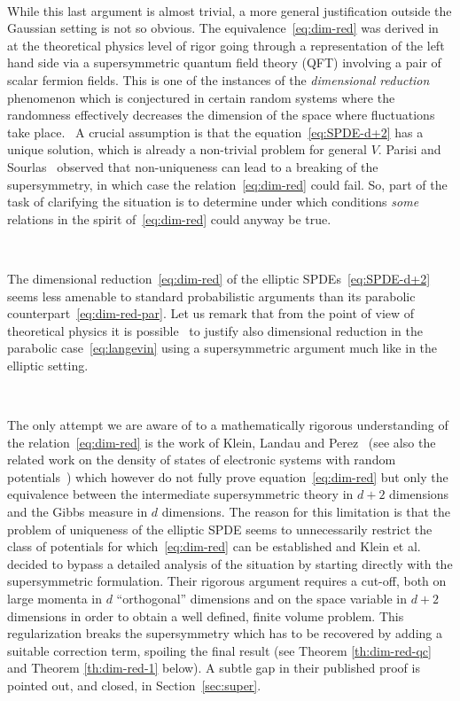 \documentclass[a4paper,10pt]{article}
\newcommand{\tmtextit}[1]{{\itshape{#1}}}
\begin{document}
\

While this last argument is almost trivial, a more general justification
outside the Gaussian setting is not so obvious. The
equivalence~{\eqref{eq:dim-red}} was derived
in~{\cite{parisi_random_1979,parisi_supersymmetric_1982}} at the theoretical
physics level of rigor going through a representation of the left hand side
via a supersymmetric quantum field theory (QFT) involving a pair of scalar
fermion fields. This is one of the instances of the \tmtextit{dimensional
reduction} phenomenon which is conjectured in certain random systems where the
randomness effectively decreases the dimension of the space where fluctuations
take place. \ A crucial assumption is that the equation~{\eqref{eq:SPDE-d+2}}
has a unique solution, which is already a non-trivial problem for general $V$.
Parisi and Sourlas~{\cite{parisi_supersymmetric_1982}} observed that
non-uniqueness can lead to a breaking of the supersymmetry, in which case the
relation~{\eqref{eq:dim-red}} could fail. So, part of the task of clarifying
the situation is to determine under which conditions \tmtextit{some} relations
in the spirit of~{\eqref{eq:dim-red}} could anyway be true.

\

The dimensional reduction~{\eqref{eq:dim-red}} of the elliptic
SPDEs~{\eqref{eq:SPDE-d+2}} seems less amenable to standard probabilistic
arguments than its parabolic counterpart~{\eqref{eq:dim-red-par}}. Let us
remark that from the point of view of theoretical physics it is
possible~{\cite{damgaard_stochastic_1988,parisi_supersymmetric_1982}} to
justify also dimensional reduction in the parabolic case~{\eqref{eq:langevin}}
using a supersymmetric argument much like in the elliptic setting.

\

The only attempt we are aware of to a mathematically rigorous understanding
of the relation~{\eqref{eq:dim-red}} is the work of Klein, Landau and
Perez~{\cite{klein_supersymmetry_1985,Klein1984,klein_supersymmetry_1983}}
(see also the related work on the density of states of electronic systems with
random potentials~{\cite{klein_density_1985}}) which however do not fully
prove equation~{\eqref{eq:dim-red}} but only the equivalence between the
intermediate supersymmetric theory in $d + 2$ dimensions and the Gibbs measure
in $d$ dimensions. The reason for this limitation is that the problem of
uniqueness of the elliptic SPDE seems to unnecessarily restrict the class of
potentials for which~{\eqref{eq:dim-red}} can be established and Klein et al.
decided to bypass a detailed analysis of the situation by starting directly
with the supersymmetric formulation. Their rigorous argument requires a
cut-off, both on large momenta in $d$ ``orthogonal'' dimensions and on the
space variable in $d + 2$ dimensions in order to obtain a well defined, finite
volume problem. This regularization breaks the supersymmetry which has to be
recovered by adding a suitable correction term, spoiling the final result (see
Theorem \ref{th:dim-red-qc} and Theorem \ref{th:dim-red-1} below). A subtle
gap in their published proof is pointed out, and closed, in
Section~\ref{sec:super}.
\end{document}
